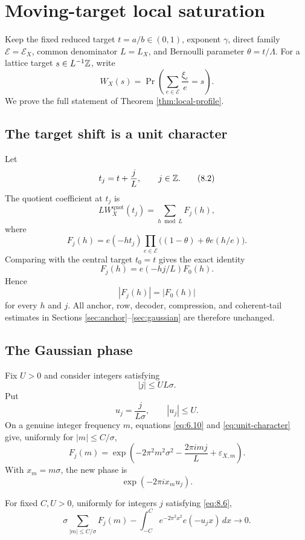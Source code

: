 \section{Moving-target local saturation}\label{sec:moving-target}

Keep the fixed reduced target $t=a/b\in(0,1)$, exponent $\gamma$, direct family $\mathcal E=\mathcal E_X$, common denominator $L=L_X$, and Bernoulli parameter $\theta=t/\Lambda$. For a lattice target $s\in L^{-1}\mathbb Z$, write
\[
W_X(s)=
\Pr\left(\sum_{e\in\mathcal E}\frac{\xi_e}{e}=s\right).
\tag{8.1}\label{eq:8.1}
\]
We prove the full statement of Theorem \ref{thm:local-profile}.

\subsection{The target shift is a unit character}

Let
\[
t_j=t+\frac{j}{L},
\qquad j\in\mathbb Z.
\tag{8.2}\label{eq:8.2}
\]
The quotient coefficient at $t_j$ is
\[
L W_X^{\mathrm{quot}}(t_j)
=
\sum_{h\bmod L}F_j(h),
\tag{8.3}\label{eq:8.3}
\]
where
\[
F_j(h)
=
e(-ht_j)
\prod_{e\in\mathcal E}
\bigl((1-\theta)+\theta e(h/e)\bigr).
\]
Comparing with the central target $t_0=t$ gives the exact identity
\[
F_j(h)=e(-hj/L)F_0(h).
\tag{8.4}\label{eq:unit-character}
\]
Hence
\[
|F_j(h)|=|F_0(h)|
\tag{8.5}\label{eq:8.5}
\]
for every $h$ and $j$. All anchor, row, decoder, compression, and coherent-tail estimates in Sections \ref{sec:anchor}--\ref{sec:gaussian} are therefore unchanged.

\subsection{The Gaussian phase}

Fix $U>0$ and consider integers satisfying
\[
|j|\le UL\sigma.
\tag{8.6}\label{eq:8.6}
\]
Put
\[
u_j=\frac{j}{L\sigma},
\qquad |u_j|\le U.
\tag{8.7}\label{eq:8.7}
\]
On a genuine integer frequency $m$, equations \eqref{eq:6.10} and \eqref{eq:unit-character} give, uniformly for $|m|\le C/\sigma$,
\[
F_j(m)
=
\exp\left(
-2\pi^2m^2\sigma^2
-\frac{2\pi i mj}{L}
+\varepsilon_{X,m}
\right).
\tag{8.8}\label{eq:8.8}
\]
With $x_m=m\sigma$, the new phase is
\[
\exp(-2\pi i x_m u_j).
\tag{8.9}\label{eq:8.9}
\]

\begin{proposition}\label{prop:moving-major}
For fixed $C,U>0$, uniformly for integers $j$ satisfying \eqref{eq:8.6},
\[
\sigma
\sum_{|m|\le C/\sigma}F_j(m)
-
\int_{-C}^{C}e^{-2\pi^2x^2}e(-u_jx)\,dx
\longrightarrow0.
\tag{8.10}\label{eq:8.10}
\]
\end{proposition}

